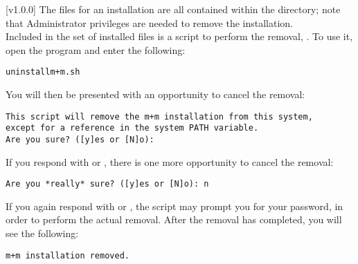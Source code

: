 [v1.0.0]
The files for an \mplusm{} installation are all contained within the
 directory; note that Administrator privileges are needed to remove the
installation.\\

Included in the set of installed files is a script to perform the removal,
.
To use it, open the  program and enter the following:
\outputBegin
\begin{verbatim}
uninstallm+m.sh
\end{verbatim}
\outputEnd{}
You will then be presented with an opportunity to cancel the removal:
\outputBegin
\begin{verbatim}
This script will remove the m+m installation from this system,
except for a reference in the system PATH variable.
Are you sure? ([y]es or [N]o):
\end{verbatim}
\outputEnd{}
If you respond with  or , there is one more opportunity to cancel
the removal:
\outputBegin
\begin{verbatim}
Are you *really* sure? ([y]es or [N]o): n
\end{verbatim}
\outputEnd{}
If you again respond with  or , the script may prompt you for your
password, in order to perform the actual removal.
After the removal has completed, you will see the following:
\outputBegin
\begin{verbatim}
m+m installation removed.
\end{verbatim}
\outputEnd
\secondaryEnd
{}
\TBD
\secondaryEnd
{}
\TBD
\secondaryEnd
\primaryEnd{}
